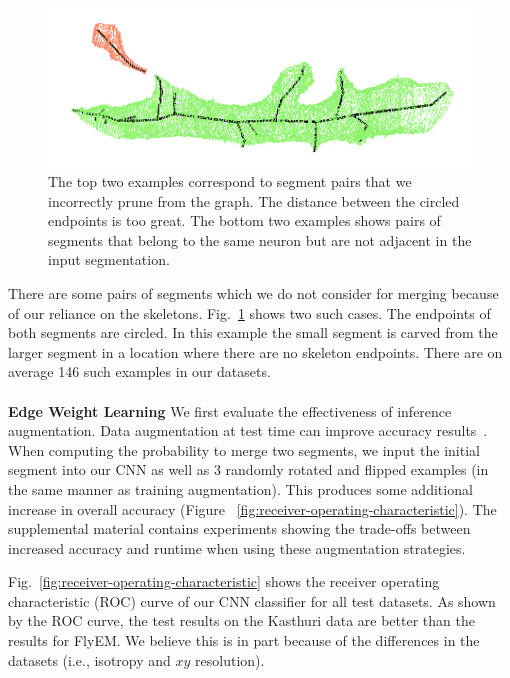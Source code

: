 \begin{figure}[t!]
	\begin{minipage}{0.45\linewidth}
		\includegraphics[width=\linewidth]{./figures/merge_candidate4.png}
	\end{minipage}
	\caption{The top two examples correspond to segment pairs that we incorrectly prune from the graph. The distance between the circled endpoints is too great. The bottom two examples shows pairs of segments that belong to the same neuron but are not adjacent in the input segmentation.}
	\label{fig:skeleton-results}
\end{figure}
There are some pairs of segments which we do not consider for merging because of our reliance on the skeletons.
Fig.~\ref{fig:skeleton-results} shows two such cases. 
The endpoints of both segments are circled.
In this example the small segment is carved from the larger segment in a location where there are no skeleton endpoints. 
There are on average 146 such examples in our datasets.
\\~\\
\noindent\textbf{Edge Weight Learning}
We first evaluate the effectiveness of inference augmentation.
Data augmentation at test time can improve accuracy results~\cite{zeng2017deepem3d,lee2017superhuman}.
When computing the probability to merge two segments, we input the initial segment into our CNN as well as 3 randomly rotated and flipped examples (in the same manner as training augmentation).
This produces some additional increase in overall accuracy (Figure ~\ref{fig:receiver-operating-characteristic}).
The supplemental material contains experiments showing the trade-offs between increased accuracy and runtime when using these augmentation strategies.

Fig.~\ref{fig:receiver-operating-characteristic} shows the receiver operating characteristic (ROC) curve of our CNN classifier for all test datasets.
As shown by the ROC curve, the test results on the Kasthuri data are better than the results for FlyEM.
We believe this is in part because of the differences in the datasets (i.e., isotropy and $xy$ resolution).




